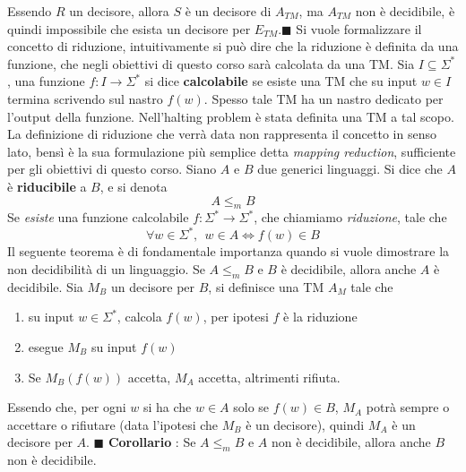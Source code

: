 \documentclass[10pt, letterpaper]{report}
\begin{document}
Essendo $R$ un decisore, allora $S$ è un decisore di $A_{TM}$, ma $A_{TM}$ non è decidibile, è quindi impossibile che esista un decisore per $E_{TM}$.\hfill$\blacksquare$\acc 
Si vuole formalizzare il concetto di riduzione, intuitivamente si può dire che la riduzione è definita da una funzione, che negli obiettivi di questo corso sarà calcolata da una TM.\acc 
{} Sia $I\subseteq \Sigma^*$, una funzione $f:I\rightarrow \Sigma^*$ si dice \textbf{calcolabile} se esiste una TM che su input $w\in I$ termina scrivendo sul nastro $f(w)$. Spesso tale TM ha un nastro dedicato per l'output della funzione.\acc 
Nell'halting problem è stata definita una TM a tal scopo. La definizione di riduzione che verrà data non rappresenta il concetto in senso lato, bensì è la sua formulazione più semplice detta \textit{mapping reduction}, sufficiente per gli obiettivi di questo corso.\acc 
{} Siano $A$ e $B$ due generici linguaggi. Si dice che $A$ è \textbf{riducibile} a $B$, e si denota 
$$ A\le_m B$$
Se \textit{esiste} una funzione calcolabile $f:\Sigma^*\rightarrow \Sigma^*$, che chiamiamo \textit{riduzione}, tale che 
$$ \forall w\in\Sigma^*, \ \ w\in A \iff f(w)\in B$$
Il seguente teorema è di fondamentale importanza quando si vuole dimostrare la non decidibilità di un linguaggio.\acc 
\teo{} Se $A\le_m B$ e $B$ è decidibile, allora  anche $A$ è decidibile.\acc 
\dimo{} Sia $M_B$ un decisore per $B$, si definisce una TM $A_M$ tale che \begin{enumerate}
    \item su input $w\in\Sigma^*$, calcola $f(w)$, per ipotesi $f$ è la riduzione
    \item esegue $M_B$ su input $f(w)$ 
    \item Se $M_B(f(w))$ accetta, $M_A$ accetta, altrimenti rifiuta.
\end{enumerate}
Essendo che, per ogni $w$ si ha che $w\in A$ solo se $f(w)\in B$, $M_A$ potrà sempre o accettare o rifiutare (data l'ipotesi che $M_B$ è un decisore), quindi  $M_A$ è un decisore per $A$.
\hfill$\blacksquare$\acc 
\textbf{Corollario} : Se $A\le_m B$ e $A$ non è decidibile, allora  anche $B$ non è decidibile.
\end{document}
